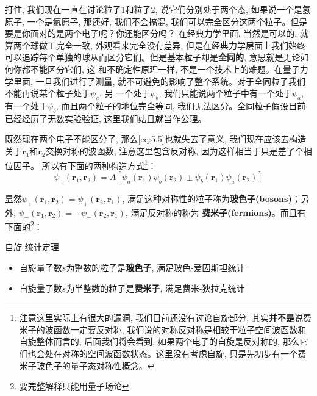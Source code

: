 \documentclass[a4paper,zihao=-4,linespread=1]{ctexrep}
\begin{document}
    打住, 我们现在一直在讨论粒子1和粒子2, 说它们分别处于两个态, 如果说一个是氢原子, 一个是氦原子, 那还好, 我们不会搞混, 我们可以完全区分这两个粒子。但是要是你面对的是两个电子呢？你还能区分吗？
    在经典力学里面, 当然是可以的, 就算两个球做工完全一致, 外观看来完全没有差异, 但是在经典力学层面上我们始终可以追踪每个单独的球从而区分它们。但是基本粒子却是\textbf{全同的}, 意思就是无论如何你都不能区分它们, 这
    和不确定性原理一样, 不是一个技术上的难题。在量子力学里面, 一旦我们进行了测量, 就不可避免的影响了整个系统。对于全同粒子我们不能再说某个粒子处于$\psi_a$, 另
    一个处于$\psi_b$, 我们只能说两个粒子中有一个处于$\psi_a$, 有一个处于$\psi_b$, 而且两个粒子的地位完全等同, 我们无法区分。全同粒子假设目前已经经历了无数实验验证, 这里我们姑且就当作公理。

    既然现在两个电子不能区分了, 那么\ref{eq:5.5}也就失去了意义, 我们现在应该去构造关于$\mathbf{r}_1$和$\mathbf{r}_2$交换对称的波函数, 注意这里包含反对称, 因为这样相当于只是差了个相位因子。
    所以有下面的两种构造方式\footnote{注意这里实际上有很大的漏洞, 我们目前还没有讨论自旋部分, 其实\textbf{并不是}说费米子的波函数一定要反对称, 我们说的对称反对称是相较于粒子空间波函数和自旋整体而言的, 后面我们将会看到, 如果两个电子的自旋是反对称的, 那么它们也会处在对称的空间波函数状态。这里没有考虑自旋, 只是先初步有一个费米子玻色子的量子态对称性概念。}：
    \begin{equation}
        \label{eq:5.6}
        \psi_\pm(\mathbf{r}_1,\mathbf{r}_2)=A\left[\psi_a(\mathbf{r}_1)\psi_b(\mathbf{r}_2)\pm\psi_b(\mathbf{r}_1)\psi_a(\mathbf{r}_2)\right]
    \end{equation}
    
    显然$\psi_+(\mathbf{r}_1,\mathbf{r}_2)=\psi_+(\mathbf{r}_2,\mathbf{r}_1)$, 满足这种对称性的粒子称为\textbf{玻色子(bosons)}；另外, $\psi_-(\mathbf{r}_1,\mathbf{r}_2)=-\psi_-(\mathbf{r}_2,\mathbf{r}_1)$, 满足反对称的称为
    \textbf{费米子(fermions)}。而且有下面的\footnote{要完整解释只能用量子场论}：
    \begin{theorem}{自旋-统计定理}
        \begin{itemize}
            \item 自旋量子数$s$为整数的粒子是\textbf{玻色子}, 满足玻色-爱因斯坦统计
            \item 自旋量子数$s$为半整数的粒子是\textbf{费米子}, 满足费米-狄拉克统计
        \end{itemize}
    \end{theorem}
\end{document}
